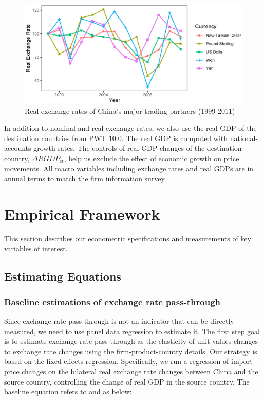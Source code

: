 \documentclass[12pt]{article}
\begin{document}
\begin{figure}[htbp]
	\centering
	\includegraphics[width=1\textwidth]{figure/figure2.eps}
	\caption{Real exchange rates of China's major trading partners (1999-2011)}
	\label{fig.RER}
\end{figure}

In addition to nominal and real exchange rates, we also use the real GDP of the destination countries from PWT 10.0. The real GDP is computed with national-accounts growth rates. The controls of real GDP changes of the destination country, $\Delta RGDP_{ct}$, help us exclude the effect of economic growth on price movements. All macro variables including exchange rates and real GDPs are in annual terms to match the firm information survey.

\section{Empirical Framework} \label{Framework}
This section describes our econometric specifications and measurements of key variables of interest.

\subsection{Estimating Equations} \label{Framework-Equations}

\subsubsection{Baseline estimations of exchange rate pass-through}

Since exchange rate pass-through is not an indicator that can be directly measured, we need to use panel data regression to estimate it. The first step goal is to estimate exchange rate pass-through as the elasticity of unit values changes to exchange rate changes using the firm-product-country details. Our strategy is based on the fixed effects regression. Specifically, we run a regression of import price changes on the bilateral real exchange rate changes between China and the source country, controlling the change of real GDP in the source country. The baseline equation refers to \cite{aik2014} and \cite{lmx2015} as below:
\end{document}
